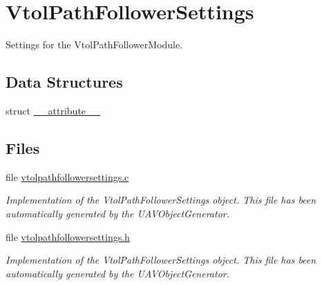 \hypertarget{group___vtol_path_follower_settings}{\section{\-Vtol\-Path\-Follower\-Settings}
\label{group___vtol_path_follower_settings}
}


\-Settings for the \-Vtol\-Path\-Follower\-Module.  


\subsection*{\-Data \-Structures}
\begin{DoxyCompactItemize}
\item 
struct \hyperlink{struct____attribute____}{\-\_\-\-\_\-attribute\-\_\-\-\_\-}
\end{DoxyCompactItemize}
\subsection*{\-Files}
\begin{DoxyCompactItemize}
\item 
file \hyperlink{vtolpathfollowersettings_8c}{vtolpathfollowersettings.\-c}
\begin{DoxyCompactList}\small\item\em \-Implementation of the \-Vtol\-Path\-Follower\-Settings object. \-This file has been automatically generated by the \-U\-A\-V\-Object\-Generator. \end{DoxyCompactList}\item 
file \hyperlink{vtolpathfollowersettings_8h}{vtolpathfollowersettings.\-h}
\begin{DoxyCompactList}\small\item\em \-Implementation of the \-Vtol\-Path\-Follower\-Settings object. \-This file has been automatically generated by the \-U\-A\-V\-Object\-Generator. \end{DoxyCompactList}\end{DoxyCompactItemize}
